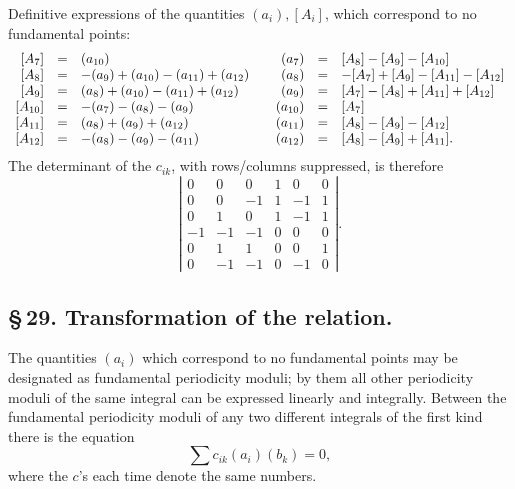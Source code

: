 \documentclass[10pt]{article}
\begin{document}
\noindent Definitive expressions of the quantities \((a_i),[A_i]\), which correspond to no fundamental points:
\[
\begin{array}{rcl@{\qquad}rcl}
{}[A_7]&=&(a_{10})&(a_7)&=&[A_8]-[A_9]-[A_{10}]\\
{}[A_8]&=&-(a_9)+(a_{10})-(a_{11})+(a_{12})&(a_8)&=&-[A_7]+[A_9]-[A_{11}]-[A_{12}]\\
{}[A_9]&=&(a_8)+(a_{10})-(a_{11})+(a_{12})&(a_9)&=&[A_7]-[A_8]+[A_{11}]+[A_{12}]\\
{}[A_{10}]&=&-(a_7)-(a_8)-(a_9)&(a_{10})&=&[A_7]\\
{}[A_{11}]&=&(a_8)+(a_9)+(a_{12})&(a_{11})&=&[A_8]-[A_9]-[A_{12}]\\
{}[A_{12}]&=&-(a_8)-(a_9)-(a_{11})&(a_{12})&=&[A_8]-[A_9]+[A_{11}].
\end{array}
\]
The determinant of the \(c_{ik}\), with rows/columns suppressed, is therefore
\[
\left|\begin{array}{rrrrrr}
 0& 0& 0& 1& 0& 0\\
 0& 0&-1& 1&-1& 1\\
 0& 1& 0& 1&-1& 1\\
-1&-1&-1& 0& 0& 0\\
 0& 1& 1& 0& 0& 1\\
 0&-1&-1& 0&-1& 0
\end{array}\right|.
\]

\subsection*{\S\,29. Transformation of the relation.}

The quantities \((a_i)\) which correspond to no fundamental points may be designated as fundamental periodicity moduli; by them all other periodicity moduli of the same integral can be expressed linearly and integrally. Between the fundamental periodicity moduli of any two different integrals of the first kind there is the equation
\[
\tag{1}\sum c_{ik}(a_i)(b_k)=0,
\]
where the \(c\)'s each time denote the same numbers.
\end{document}
